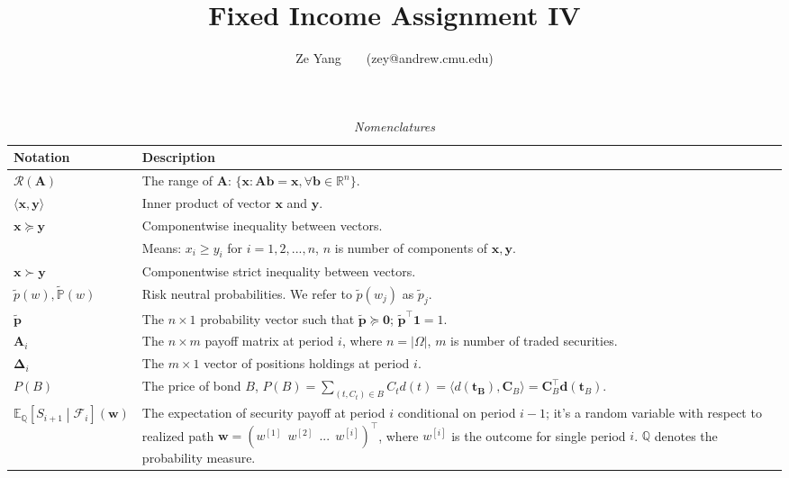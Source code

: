 \documentclass[a4paper, 10pt]{article}
\title{\textbf{Fixed Income Assignment IV}}
\author{Ze Yang~~~~(zey@andrew.cmu.edu)}
\renewcommand{\arraystretch}{1.4}
\theoremstyle{definition}
\theoremstyle{hSol}
\begin{document}
\maketitle


\begin{table}[h]
\vspace{-10pt}
\caption{\textit{Nomenclatures}}
\vspace{3pt}
\centering
\def\arraystretch{1.15}
\begin{tabular}{lL}
\hline
Notation & \hspace{4.6cm} Description \\ 
\hline
$\mathcal{R}(\bm{A})$ & The range of $\bm{A}$: $\{\bm{x}: \bm{Ab}=\bm{x}, \forall \bm{b}\in \mathbb{R}^n\}$. \\
$\langle \bm{x}, \bm{y} \rangle$ & Inner product of vector $\bm{x}$ and $\bm{y}$. \\
$\bm{x}\succeq \bm{y}$ & Componentwise inequality between vectors.\\
& Means: $x_i \geq y_i$ for $i=1,2,...,n$, $n$ is number of components of $\bm{x}, \bm{y}$.\\
$\bm{x}\succ \bm{y}$ & Componentwise strict inequality between vectors.\\
$\tilde{p}(w), \tilde{\mathbb{P}}\left(w\right)$ & Risk neutral probabilities. We refer to $\tilde{p}(w_j)$ as $\tilde{p}_j$.\\
$\tilde{\bm{p}}$ & The $n \times 1$ probability vector such that $\tilde{\bm{p}}\succeq \bm{0}$; $\tilde{\bm{p}}^{\top} \bm{1}=1$.\\
$\bm{A}_i$ & The $n\times m$ payoff matrix at period $i$, where $n=|\Omega|$, $m$ is number of traded securities.\\
$\bm{\Delta}_i$ & The $m\times 1$ vector of positions holdings at period $i$.\\
$P(B)$ & The price of bond $B$, $P(B)=\sum_{(t,C_t) \in B}C_td(t)=\langle d(\bm{t_B}), \bm{C}_B \rangle = \bm{C}_B^{\top}\bm{d}(\bm{t}_B)$.  \\
$\mathbb{E}_{\mathbb{Q}}\left[S_{i+1}\middle|\mathcal{F}_{i}\right](\bm{w})$ & The expectation of security payoff at period $i$ conditional on period $i-1$; it's a random variable with respect to realized path $\bm{w} = (w^{[1]}~~w^{[2]}~~...~~w^{[i]})^{\top}$, where $w^{[i]}$ is the outcome for single period $i$. $\mathbb{Q}$ denotes the probability measure.\\
\hline 
\end{tabular}
\label{tab:Nomen}
\end{table}
\end{document}
